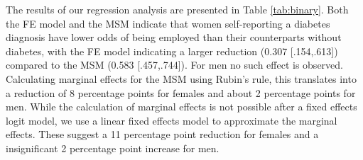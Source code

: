 The results of our regression analysis are presented in Table \ref{tab:binary}. Both the \ac{FE} model and the \ac{MSM} indicate that women self-reporting a diabetes diagnosis have lower odds of being employed than their counterparts without diabetes, with the \ac{FE} model indicating a larger reduction (0.307 [.154,.613]) compared to the \ac{MSM} (0.583 [.457,.744]). For men no such effect is observed. Calculating marginal effects for the \ac{MSM} using Rubin's rule, this translates into a reduction of 8 percentage points for females and about 2 percentage points for men. While the calculation of marginal effects is not possible after a fixed effects logit model, we use a linear fixed effects model to approximate the marginal effects. These suggest a 11 percentage point reduction for females and a insignificant 2 percentage point increase for men. %

